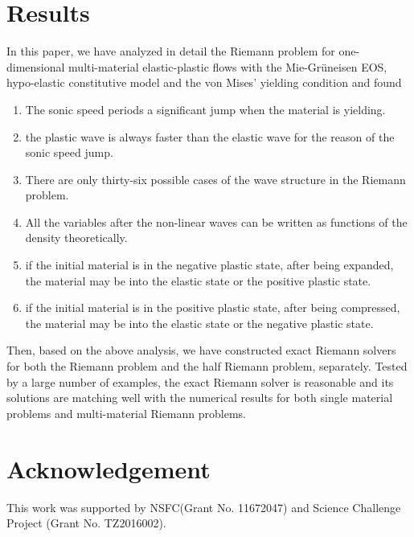 \documentclass{article}
\numberwithin{equation}{section}
\numberwithin{table}{section}
\begin{document}
\section{Results}
In this paper, we have analyzed in detail the Riemann problem for one-dimensional  multi-material elastic-plastic flows with the  Mie-Gr\"uneisen EOS, hypo-elastic constitutive model and the von Mises' yielding condition and found %
\begin{enumerate}
	\item The sonic speed periods a significant jump when the material is yielding.

	\item the plastic wave is always faster than the elastic wave for the reason of the sonic speed jump.
	
	  \item There are only thirty-six possible cases of the wave structure in the Riemann problem.

	 \item All the variables after the non-linear waves can be written as functions of the density theoretically.

	\item if the initial material is in the negative plastic state, after being expanded, the material may be into the elastic state or the positive plastic state.

	\item if the initial material is in the positive plastic state, after being compressed, the material may be into the elastic state or the negative plastic state.
	\end{enumerate}
	  Then, based on the above analysis, we have constructed exact Riemann solvers for  both the Riemann problem  and the half Riemann problem, separately. Tested by  a large number of examples, the exact Riemann solver is reasonable and  its solutions  are matching well with the numerical results for both  single material problems and multi-material Riemann problems.

\section*{Acknowledgement}
This work was supported by NSFC(Grant No. 11672047) and Science Challenge Project (Grant No. TZ2016002).


\end{document}
